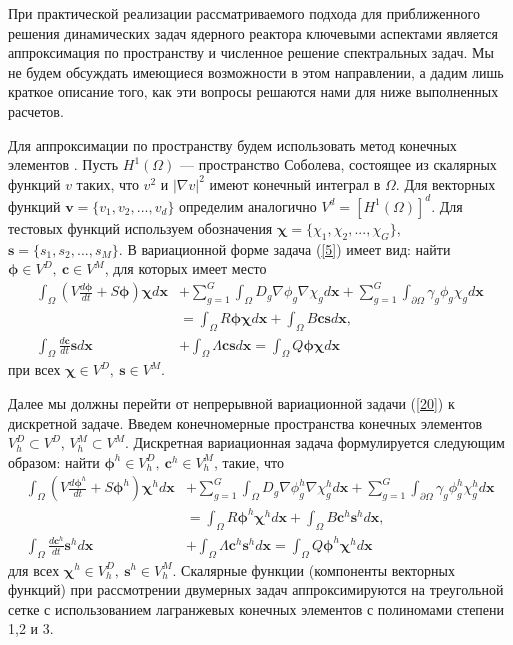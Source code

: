 \documentclass[authoryear]{elsarticle}
\begin{document}
При практической реализации рассматриваемого подхода для приближенного решения
динамических задач ядерного реактора ключевыми аспектами является аппроксимация по пространству и
численное решение спектральных задач. Мы не будем обсуждать имеющиеся возможности в этом направлении, а дадим
лишь краткое описание того, как эти вопросы решаются нами для ниже выполненных расчетов. 

Для аппроксимации по пространству будем использовать метод конечных элементов \citep{brenner,quarteroni}. 
Пусть $H^1(\Omega)$ --- пространство Соболева, состоящее из скалярных функций $v$ таких, 
что $v^2$ и  $\vert\nabla v\vert^2$ имеют конечный интеграл в $\Omega$. Для векторных
функций $\bm v = \{v_1, v_2, ..., v_d\}$ определим аналогично $V^d = [H^1(\Omega)]^d$.  
Для тестовых функций используем обозначения $\bm \chi = \{\chi_1, \chi_2, ..., \chi_G\}$,
$\bm s = \{s_1, s_2, ..., s_M\}$. 
В вариационной форме задача (\ref{5}) имеет вид: найти $\bm \phi \in V^D, \ \bm c \in V^M$, для которых имеет место
\begin{equation}\label{20}
\begin{split}
 \int_\Omega \left (V \frac{d \bm\phi}{d t} + S\bm \phi \right )\bm \chi  d\bm x 
 & + \sum_{g=1}^{G} \int_\Omega D_g\nabla \phi_g \nabla \chi_g  d\bm x 
 + \sum_{g=1}^{G} \int_{\partial \Omega} \gamma_g \phi_g \chi_g  d\bm x \\
 & = \int_\Omega R \bm \phi\bm \chi d\bm x + \int_\Omega B\bm c\bm s d\bm x, \\
 \int_\Omega \frac{d \bm{c}}{d t} \bm s d\bm x 
 &+ \int_\Omega \Lambda \bm{c} \bm s d\bm x = \int_\Omega Q \bm{\phi} \bm \chi d\bm x
\end{split}
\end{equation}
при всех $\bm \chi  \in V^D, \ \bm s \in V^M$.

Далее мы должны перейти от непрерывной вариационной задачи (\ref{20}) к дискретной задаче. 
Введем конечномерные пространства конечных элементов $V_h^D \subset V^D$, $V_h^M \subset V^M$.
Дискретная вариационная задача формулируется следующим образом:
найти $\bm \phi^h \in V_h^D, \ \bm c^h \in V_h^M$, такие, что
\begin{equation}\label{21}
\begin{split}
 \int_\Omega \left (V \frac{d \bm\phi^h}{d t} + S\bm \phi^h \right )\bm \chi^h  d\bm x 
 & + \sum_{g=1}^{G} \int_\Omega D_g\nabla \phi_g^h \nabla \chi_g^h  d\bm x 
 + \sum_{g=1}^{G} \int_{\partial \Omega} \gamma_g \phi_g^h \chi_g^h  d\bm x \\
 & = \int_\Omega R \bm \phi^h \bm \chi^h d\bm x + \int_\Omega B\bm c^h \bm s^h d\bm x, \\
 \int_\Omega \frac{d \bm{c}^h}{d t} \bm s^h d\bm x 
 &+ \int_\Omega \Lambda \bm{c}^h \bm s^h d\bm x = \int_\Omega Q \bm{\phi}^h \bm \chi^h d\bm x
\end{split}
\end{equation}
для всех $\bm \chi^h  \in V_h^D, \ \bm s^h \in V_h^M$.
Скалярные функции (компоненты векторных функций) при рассмотрении двумерных задач аппроксимируются на треугольной сетке
с использованием лагранжевых конечных элементов с полиномами степени 1,2 и 3.
\end{document}
